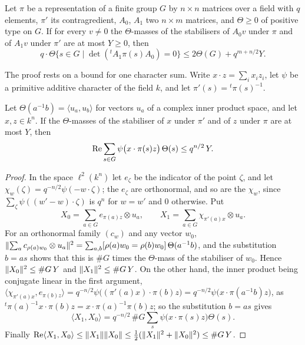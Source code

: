 \begin{lemma}\label{lem:singular-minors}
Let $\pi$ be a representation of a finite group $G$ by $n\times n$ matrices over a field with $q$ elements, $\pi'$ its contragredient, $A_0$, $A_1$ two $n\times m$
matrices, and $\Theta\ge0$ of positive type on $G$. If for every $v\ne0$ the $\Theta$-masses of the stabilisers of $A_0v$ under $\pi$ and of $A_1v$ under $\pi'$ are at most
$Y\ge0$, then
\[
  q\cdot\Theta\{s\in G\mid\det({}^tA_1\pi(s)A_0)=0\}\le2\Theta(G)+q^{m+n/2}Y .
\]
\end{lemma}

The proof rests on a bound for one character sum. Write $x\cdot z=\sum_ix_iz_i$, let $\psi$ be a primitive additive character of the field $k$, and let $\pi'(s)={}^t\pi(s)^{-1}$.

\begin{lemma}\label{lem:positive-type-sum}
Let $\Theta(a^{-1}b)=\langle u_a,u_b\rangle$ for vectors $u_a$ of a complex inner product space, and let $x,z\in k^n$. If the $\Theta$-masses of the stabiliser of $x$ under $\pi'$ and of $z$ under $\pi$ are at most $Y$,
then
\[
  \operatorname{Re}\sum_{s\in G}\psi\bigl(x\cdot\pi(s)z\bigr)\,\Theta(s)\le q^{n/2}\,Y.
\]
\end{lemma}

\begin{proof}
In the space $\ell^2(k^n)$ let $e_\zeta$ be the indicator of the point $\zeta$, and let $\chi_w(\zeta)=q^{-n/2}\psi(-w\cdot\zeta)$; the $e_\zeta$ are orthonormal, and so are the $\chi_w$, since $\sum_\zeta\psi((w'-w)\cdot\zeta)$ is $q^n$ for $w=w'$ and $0$
otherwise. Put
\[
  X_0=\sum_{a\in G}e_{\pi(a)z}\otimes u_a,\qquad X_1=\sum_{a\in G}\chi_{\pi'(a)x}\otimes u_a.
\]
For an orthonormal family $(c_w)$ and any vector $w_0$, $\lVert \sum_ac_{\rho(a)w_0}\otimes u_a\rVert^2=\sum_{a,b}[\rho(a)w_0=\rho(b)w_0]\,\Theta(a^{-1}b)$, and the substitution $b=as$ shows that this is $\#G$ times the $\Theta$-mass of the stabiliser
of $w_0$. Hence $\lVert X_0\rVert^2\le\#G\,Y$ and $\lVert X_1\rVert^2\le\#G\,Y$. On the other hand, the inner product being conjugate linear in the first argument, $\langle\chi_{\pi'(a)x},e_{\pi(b)z}\rangle=q^{-n/2}\psi\bigl((\pi'(a)x)\cdot\pi(b)z\bigr)=q^{-n/2}\psi\bigl(x\cdot\pi(a^{-1}b)z\bigr)$,
as ${}^t\pi(a)^{-1}x\cdot\pi(b)z=x\cdot\pi(a)^{-1}\pi(b)z$; so the substitution $b=as$ gives
\[
  \langle X_1,X_0\rangle=q^{-n/2}\,\#G\sum_s\psi\bigl(x\cdot\pi(s)z\bigr)\Theta(s).
\]
Finally $\operatorname{Re}\langle X_1,X_0\rangle\le\lVert X_1\rVert\lVert X_0\rVert\le\frac12(\lVert X_1\rVert^2+\lVert X_0\rVert^2)\le\#G\,Y$.
\end{proof}

